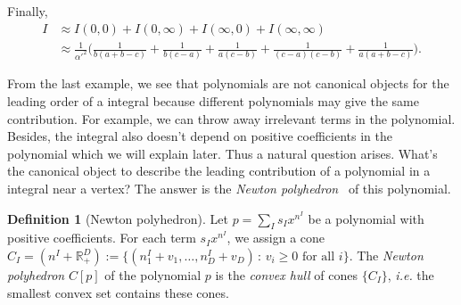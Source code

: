 \documentclass[12pt]{article}
\theoremstyle{definition}
\newtheorem{defi}[para]{Definition}
\theoremstyle{plain}
\begin{document}
Finally,
\begin{align*}
	I&\approx I(0,0)+I(0,\infty)+I(\infty,0)+I(\infty,\infty)\\
	 &\approx \frac{1}{{\alpha'}^2}
	 \biggl(
\frac{1}{b (a+b-c)}+\frac{1}{b (c-a)}+\frac{1}{a (c-b)}+\frac{1}{(c-a) (c-b)}+\frac{1}{a (a+b-c)}
	 \biggr).
\end{align*}

From the last example, we see that polynomials are not canonical objects 
for the leading order of a integral because different polynomials may give the 
same contribution. For example, we can throw away irrelevant terms in the 
polynomial. Besides, the integral also doesn't depend on positive coefficients
in the polynomial which we will explain later.
Thus a natural question arises. What's the canonical object to describe the 
leading contribution of a polynomial in a integral near a vertex? The answer is 
the \textit{Newton polyhedron}~\cite{} of this polynomial.

\begin{defi}[Newton polyhedron]
Let $p=\sum_{I}s_I x^{n^I}$ be a polynomial with positive coefficients.
For each term $s_I x^{n^I}$, we assign a cone 
$C_{I}=(n^I+\mathbb R^D_{+}):=\{(n^I_1+v_1,\dots,n^I_D+v_D)\,:\, 
\text{$v_i\geq 0$ for all $i$}\}$. The 
\textit{Newton polyhedron} $C[p]$ of the polynomial $p$ 
is the \textit{convex hull} of cones $\{C_I\}$, 
\textit{i.e.} the smallest convex set contains these cones.
\end{defi}



\end{document}
